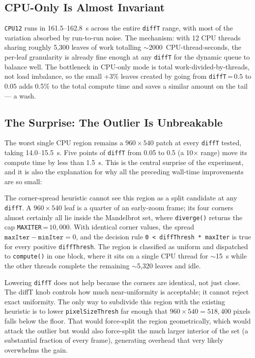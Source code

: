 \documentclass[
	english,
	letterpaper, oneside
]{article}
\begin{document}
\subsection{CPU-Only Is Almost Invariant}

\texttt{CPU12} runs in 161.5--162.8~s across the entire \texttt{diffT}
range, with most of the variation absorbed by run-to-run noise. The
mechanism: with 12 CPU threads sharing roughly 5{,}300 leaves of work
totalling $\sim$2000~CPU-thread-seconds, the per-leaf granularity is
already fine enough at any \texttt{diffT} for the dynamic queue to
balance well. The bottleneck in CPU-only mode is total
work-divided-by-threads, not load imbalance, so the small +3\% leaves
created by going from \texttt{diffT}\,=\,$0.5$ to $0.05$ adds 0.5\%
to the total compute time and saves a similar amount on the tail --- a
wash.

\subsection{The Surprise: The Outlier Is Unbreakable}

The worst single CPU region remains a $960 \times 540$ patch
at every \texttt{diffT} tested, taking 14.0--15.5~s. Five
points of \texttt{diffT} from 0.05 to 0.5 (a 10$\times$ range) move
its compute time by less than 1.5~s. This is the central surprise of
the experiment, and it is also the explanation for why all the
preceding wall-time improvements are so small:

The corner-spread heuristic cannot see this region as a split
candidate at any \texttt{diffT}. A $960 \times 540$ leaf is a quarter
of an early-zoom frame; its four corners almost certainly all lie
inside the Mandelbrot set, where \texttt{diverge()} returns the cap
\texttt{MAXITER}\,=\,$10{,}000$. With identical corner values, the
spread $\texttt{maxIter} - \texttt{minIter} = 0$, and the decision
rule \texttt{0 < diffThresh * maxIter} is true for every positive
\texttt{diffThresh}. The region is classified as uniform and dispatched
to \texttt{compute()} in one block, where it sits on a single CPU
thread for $\sim$15~s while the other threads complete the remaining
$\sim$5{,}320 leaves and idle.

Lowering \texttt{diffT} does not help because the corners are
identical, not just close. The diffT knob controls how much
near-uniformity is acceptable; it cannot reject exact
uniformity. The only way to subdivide this region with the existing
heuristic is to lower \texttt{pixelSizeThresh} far enough that
$960 \times 540 = 518{,}400$ pixels falls below the floor. That would
force-split the region geometrically, which would attack the outlier
but would also force-split the much larger interior of the set (a
substantial fraction of every frame), generating overhead that very
likely overwhelms the gain.
\end{document}
